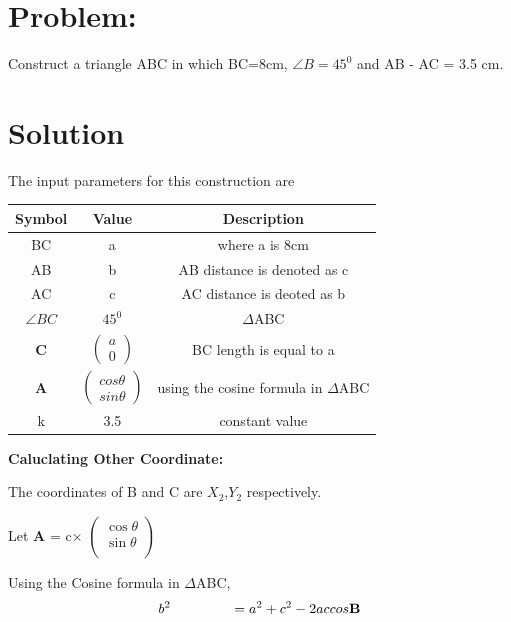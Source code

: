 \documentclass[10pt,a4paper]{report}
\newcommand{\myvec}[1]{\ensuremath{\begin{pmatrix}#1\end{pmatrix}}}
\let\vec\mathbf
\begin{document}
\begin{multicols}{2}
\section{Problem:}  Construct a triangle ABC in which BC=8cm, $\angle{B}=45^0$ and AB - AC = 3.5 cm.\vspace{3mm}
\section{Solution}
The input parameters for this construction are
\begin{center}
\begin{tabular}{|c|c|c|}
  \hline
  \textbf{Symbol}&\textbf{Value}&\textbf{Description}\\
  \hline
  BC & a & where a is 8cm\\
  \hline
  AB & b & AB distance is denoted as c \\
  \hline 
  AC & c & AC distance is deoted as b \\
  \hline
  $\angle{BC}$ & $45^0$ &  $\Delta$ABC \\
  \hline
  $\vec{C}$ & $\myvec{a\\0}$ & BC length is equal to a\\
  \hline
  $\vec{A}$ & $\myvec{ cos\theta \\ sin\theta}$ & using the cosine formula in $\Delta$ABC\\
  \hline
  k & 3.5 & constant value\\
  \hline
\end{tabular}
\end{center}
\raggedright\textbf{Caluclating Other Coordinate: } \\
\raggedright The coordinates of B and C are $X_{2}$,$Y_{2}$ respectively. \\
  \raggedright Let \textbf{A} = c$\times$
  $\begin{pmatrix} 
 \cos \theta\\
  \sin\theta \\
\end{pmatrix}$ \\
\raggedright Using the Cosine formula in  $\Delta$ABC, \\ \vspace{3mm}
\begin{equation}
{b}^2\hspace{1.5cm}= {a}^2 + {c}^2 - 2accos\vec{B}
\end{equation}
\begin{equation}

\end{equation}
\end{multicols}
\end{document}
